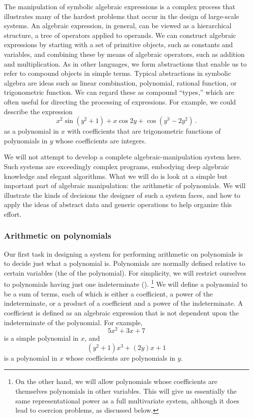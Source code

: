 The manipulation of symbolic algebraic expressions is a complex process that illustrates many of the hardest problems that occur in the design of large-scale systems.
An algebraic expression, in general, can be viewed as a hierarchical structure, a tree of operators applied to operands.
We can construct algebraic expressions by starting with a set of primitive objects, such as constants and variables, and combining these by means of algebraic operators, such as addition and multiplication.
As in other languages, we form abstractions that enable us to refer to compound objects in simple terms.
Typical abstractions in symbolic algebra are ideas such as linear combination, polynomial, rational function, or trigonometric function.
We can regard these as compound “types,” which are often useful for directing the processing of expressions.
For example, we could describe the expression
\[
	x^2 \sin (y^2 + 1) + x \cos 2y + \cos(y^3 - 2y^2) \,.
\]
as a polynomial in \( x \) with coefficients that are trigonometric functions of polynomials in \( y \) whose coefficients are integers.

We will not attempt to develop a complete algebraic-manipulation system here.
Such systems are exceedingly complex programs, embodying deep algebraic knowledge and elegant algorithms.
What we will do is look at a simple but important part of algebraic manipulation:
the arithmetic of polynomials.
We will illustrate the kinds of decisions the designer of such a system faces, and how to apply the ideas of abstract data and generic operations to help organize this effort.



\subsubsection*{Arithmetic on polynomials}

Our first task in designing a system for performing arithmetic on polynomials is to decide just what a polynomial is.
Polynomials are normally defined relative to certain variables (the  of the polynomial).
For simplicity, we will restrict ourselves to polynomials having just one indeterminate ().%
\footnote{
	On the other hand, we will allow polynomials whose coefficients are themselves polynomials in other variables.
	This will give us essentially the same representational power as a full multivariate system, although it does lead to coercion problems, as discussed below.
}
We will define a polynomial to be a sum of terms, each of which is either a coefficient, a power of the indeterminate, or a product of a coefficient and a power of the indeterminate.
A coefficient is defined as an algebraic expression that is not dependent upon the indeterminate of the polynomial.
For example,
\[
	5 x^2 + 3 x + 7
\]
is a simple polynomial in \( x \), and
\[
	(y^2 + 1) x^3 + (2y) x + 1
\]
is a polynomial in \( x \) whose coefficients are polynomials in \( y \).

